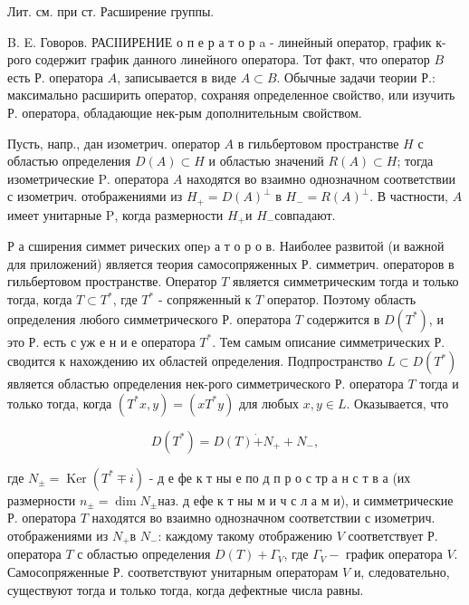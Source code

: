 \documentclass[10pt]{article}
\begin{document}
Лит. см. при ст. Расширение группы.



B. E. Говоров. РАСІІИРЕНИЕ о п е р а т о р a - линейный оператор, график к-рого содержит график данного линейного оператора. Тот факт, что оператор $B$ есть Р. оператора $A$, записывается в виде $A \subset B$. Обычные задачи теории Р.: максимально расширить оператор, сохраняя определенное свойство, или изучить Р. оператора, обладающие нек-рым дополнительным свойством.



Пусть, напр., дан изометрич. оператор $A$ в гильбертовом пространстве $H$ с областью определения $D(A) \subset H$ и областью значений $R(A) \subset H$; тогда изометрические $\mathrm{P}$. оператора $A$ находятся во взаимно однозначном соответствии с изометрич. отображениями из $H_{+}=D(A)^{\perp}$ в $H_{-}=R(A)^{\perp}$. В частности, $A$ имеет унитарные $\mathrm{P}$, когда размерности $H_{+}$и $H_{-}$совпадают.



Р а сширения симмет рических опеp а т о р о в. Наиболее развитой (и важной для приложений) является теория самосопряженных Р. симметрич. операторов в гильбертовом пространстве. Оператор $T$ является симметрическим тогда и только тогда, когда $T \subset T^{*}$, где $T^{*}$ - сопряженный к $T$ оператор. Поэтому область определения любого симметрического Р. оператора $T$ содержится в $D\left(T^{*}\right)$, и это Р. есть с уж е н и е оператора $T^{*}$. Тем самым описание симметрических Р. сводится к нахождению их областей определения. Подпространство $L \subset D\left(T^{*}\right)$ является областью определения нек-рого симметрического Р. оператора $T$ тогда и только тогда, когда $\left(T^{*} x, y\right)=\left(x T^{*} y\right)$ для любых $x, y \in L$. Оказывается, что



\[

D\left(T^{*}\right)=D(T) \dot{+} N_{+}+N_{-},

\]



где $N_{ \pm}=\operatorname{Ker}\left(T^{*} \mp i\right)$ - д е фе к т ны е по д п р о с тр а н с т в а (их размерности $n_{ \pm}=\operatorname{dim} N_{ \pm}$наз. д ефе к т ны м и ч с л а м и), и симметрические Р. оператора $T$ находятся во взаимно однозначном соответствии с изометрич. отображениями из $N_{+}$в $N_{-}$: каждому такому отображению $V$ соответствует Р. оператора $T$ с областью определения $D(T)+\Gamma_{V}$, где $\Gamma_{V}-$ график оператора $V$. Самосопряженные Р. соответствуют унитарным операторам $V$ и, следовательно, существуют тогда и только тогда, когда дефектные числа равны.
\end{document}
